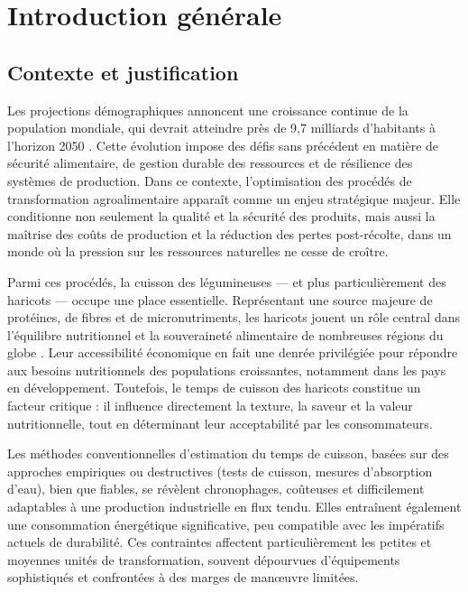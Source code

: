 \chapter{Introduction générale}
\label{chap:introduction_generale}

\section{Contexte et justification}
Les projections démographiques annoncent une croissance continue de la population mondiale, qui devrait atteindre près de 9,7 milliards d’habitants à l’horizon 2050 \cite{UN_WPP_2022}. Cette évolution impose des défis sans précédent en matière de sécurité alimentaire, de gestion durable des ressources et de résilience des systèmes de production. Dans ce contexte, l’optimisation des procédés de transformation agroalimentaire apparaît comme un enjeu stratégique majeur. Elle conditionne non seulement la qualité et la sécurité des produits, mais aussi la maîtrise des coûts de production et la réduction des pertes post-récolte, dans un monde où la pression sur les ressources naturelles ne cesse de croître.

Parmi ces procédés, la cuisson des légumineuses — et plus particulièrement des haricots — occupe une place essentielle. Représentant une source majeure de protéines, de fibres et de micronutriments, les haricots jouent un rôle central dans l’équilibre nutritionnel et la souveraineté alimentaire de nombreuses régions du globe \cite{mendoza2018prediction,mbofung2012proximate}. Leur accessibilité économique en fait une denrée privilégiée pour répondre aux besoins nutritionnels des populations croissantes, notamment dans les pays en développement. Toutefois, le temps de cuisson des haricots constitue un facteur critique : il influence directement la texture, la saveur et la valeur nutritionnelle, tout en déterminant leur acceptabilité par les consommateurs.

Les méthodes conventionnelles d’estimation du temps de cuisson, basées sur des approches empiriques ou destructives (tests de cuisson, mesures d’absorption d’eau), bien que fiables, se révèlent chronophages, coûteuses et difficilement adaptables à une production industrielle en flux tendu. Elles entraînent également une consommation énergétique significative, peu compatible avec les impératifs actuels de durabilité. Ces contraintes affectent particulièrement les petites et moyennes unités de transformation, souvent dépourvues d’équipements sophistiqués et confrontées à des marges de manœuvre limitées.

